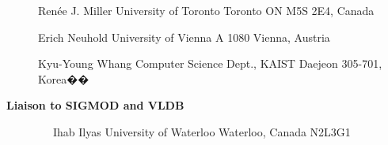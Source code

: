 \documentclass[10pt,twocolumn]{article}
\begin{document}
\begin{description}
Ren\'{e}e J. Miller \newline
University of Toronto \newline
Toronto ON M5S 2E4, Canada
\vspace{.05cm}

Erich Neuhold                  \newline
University of Vienna  \newline
A 1080 Vienna, Austria             
\vspace{.05cm}

Kyu-Young Whang 				\newline
Computer Science Dept., KAIST	\newline
Daejeon 305-701, Korea�� \newline
\vspace{-.05cm}

\item[{\bf Liaison to SIGMOD and VLDB}]
\verb-  -                      \newline
Ihab Ilyas \newline
University of Waterloo \newline
Waterloo, Canada N2L3G1

\verb-  -                      \newline
\end{description}
\end{document}
